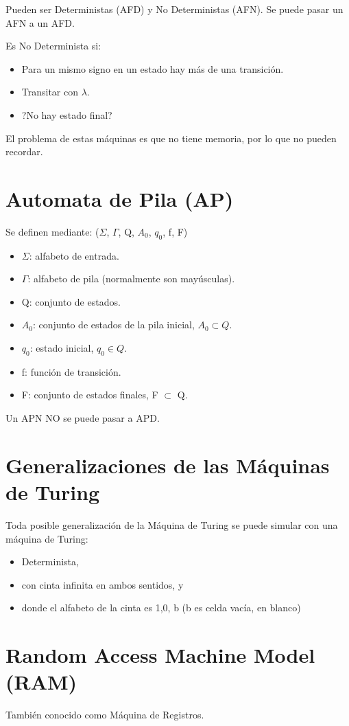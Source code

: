 Pueden ser Deterministas (AFD) y No Deterministas (AFN). Se puede pasar un AFN a un AFD.

Es No Determinista si:
\begin{itemize}
    \item Para un mismo signo en un estado hay más de una transición.
    \item Transitar con $\lambda$.
    \item ?No hay estado final?
\end{itemize}

El problema de estas máquinas es que no tiene memoria, por lo que no pueden recordar.

\section{Automata de Pila (AP)}
Se definen mediante: ($\Sigma$, $\Gamma$, Q, $A_0$, $q_0$, f, F)
\begin{itemize}
    \item $\Sigma$: alfabeto de entrada.
    \item $\Gamma$: alfabeto de pila (normalmente son mayúsculas).
    \item Q: conjunto de estados.
    \item $A_0$: conjunto de estados de la pila inicial, $A_0 \subset Q$.
    \item $q_0$: estado inicial, $q_0 \in Q$.
    \item f: función de transición.
    \item F: conjunto de estados finales, F $\subset$ Q.
\end{itemize}

Un APN NO se puede pasar a APD.

\section{Generalizaciones de las Máquinas de Turing}
Toda posible generalización de la Máquina de Turing se puede simular con una máquina de Turing: 
\begin{itemize}
    \item Determinista, 
    \item con cinta infinita en ambos sentidos, y \item donde el alfabeto de la cinta es {1,0, b} (b es celda vacía, en blanco)
\end{itemize}

\section{Random Access Machine Model (RAM)}
También conocido como Máquina de Registros.

